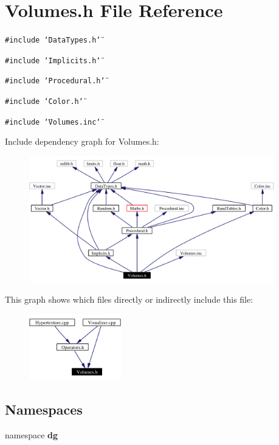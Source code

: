 \section{Volumes.h File Reference}
\label{Volumes_8h}
{\tt \#include \char`\"{}Data\-Types.h\char`\"{}}\par
{\tt \#include \char`\"{}Implicits.h\char`\"{}}\par
{\tt \#include \char`\"{}Procedural.h\char`\"{}}\par
{\tt \#include \char`\"{}Color.h\char`\"{}}\par
{\tt \#include \char`\"{}Volumes.inc\char`\"{}}\par


Include dependency graph for Volumes.h:\begin{figure}[H]
\begin{center}
\leavevmode
\includegraphics[width=302pt]{Volumes_8h__incl}
\end{center}
\end{figure}


This graph shows which files directly or indirectly include this file:\begin{figure}[H]
\begin{center}
\leavevmode
\includegraphics[width=113pt]{Volumes_8h__dep__incl}
\end{center}
\end{figure}
\subsection*{Namespaces}
\begin{CompactItemize}
\item 
namespace {\bf dg}
\end{CompactItemize}
